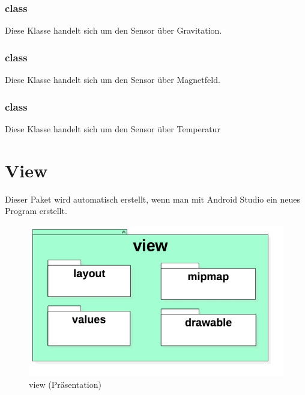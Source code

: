 \documentclass[a4paper]{scrreprt}
\begin{document}
{                \subsubsection{class }
                Diese Klasse handelt sich um den Sensor über Gravitation.
                \subsubsection{class }
                Diese Klasse handelt sich um den Sensor über Magnetfeld.
                \subsubsection{class }
                Diese Klasse handelt sich um den Sensor über Temperatur

        \newpage
        \section{View}

            Dieser Paket wird automatisch erstellt,  wenn man mit Android Studio ein neues Program erstellt.

            \vspace*{1cm}
            \begin{figure}[H]
                \centering
                \includegraphics[scale = 0.7]{view.jpg}
                \caption{view (Präsentation)}
            \end{figure}

}
\end{document}
